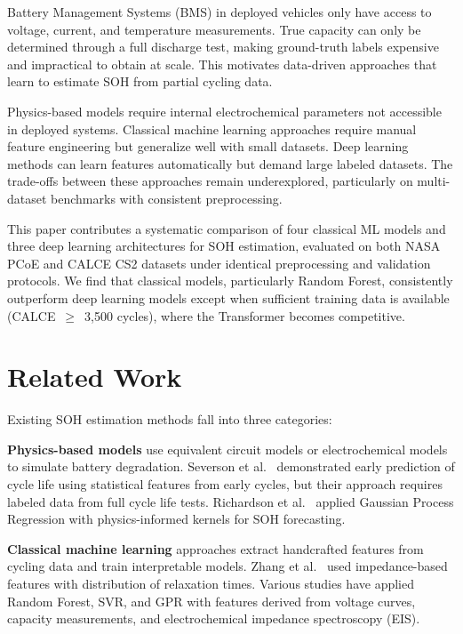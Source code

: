 \documentclass[11pt,a4paper]{article}
\begin{document}
Battery Management Systems (BMS) in deployed vehicles only have access to voltage, current, and temperature measurements. True capacity can only be determined through a full discharge test, making ground-truth labels expensive and impractical to obtain at scale. This motivates data-driven approaches that learn to estimate SOH from partial cycling data.

Physics-based models require internal electrochemical parameters not accessible in deployed systems. Classical machine learning approaches require manual feature engineering but generalize well with small datasets. Deep learning methods can learn features automatically but demand large labeled datasets. The trade-offs between these approaches remain underexplored, particularly on multi-dataset benchmarks with consistent preprocessing.

This paper contributes a systematic comparison of four classical ML models and three deep learning architectures for SOH estimation, evaluated on both NASA PCoE and CALCE CS2 datasets under identical preprocessing and validation protocols. We find that classical models, particularly Random Forest, consistently outperform deep learning models except when sufficient training data is available (CALCE~$\geq$~3,500 cycles), where the Transformer becomes competitive.

\section{Related Work}
\label{sec:related}

Existing SOH estimation methods fall into three categories:

\textbf{Physics-based models} use equivalent circuit models or electrochemical models to simulate battery degradation. Severson et al.~\cite{severson2019} demonstrated early prediction of cycle life using statistical features from early cycles, but their approach requires labeled data from full cycle life tests. Richardson et al.~\cite{richardson2017} applied Gaussian Process Regression with physics-informed kernels for SOH forecasting.

\textbf{Classical machine learning} approaches extract handcrafted features from cycling data and train interpretable models. Zhang et al.~\cite{zhang2020} used impedance-based features with distribution of relaxation times. Various studies have applied Random Forest, SVR, and GPR with features derived from voltage curves, capacity measurements, and electrochemical impedance spectroscopy (EIS).
\end{document}
